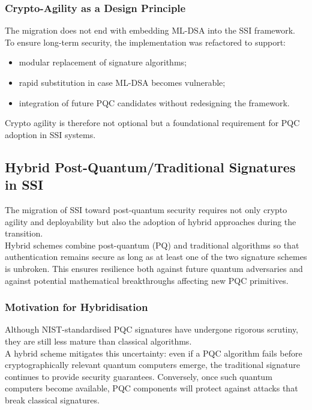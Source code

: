 \subsubsection*{Crypto-Agility as a Design Principle}
The migration does not end with embedding ML-DSA into the SSI framework.\\
To ensure long-term security, the implementation was refactored to support:
\begin{itemize}
    \item modular replacement of signature algorithms;
    \item rapid substitution in case ML-DSA becomes vulnerable;
    \item integration of future PQC candidates without redesigning the framework.
\end{itemize}

\noindent
Crypto agility is therefore not optional but a foundational requirement for PQC adoption in SSI systems.

\subsection *{Hybrid Post-Quantum/Traditional Signatures in SSI}

The migration of SSI toward post-quantum security requires not only crypto agility and deployability but also the adoption of hybrid approaches during the transition.\\
Hybrid schemes combine post-quantum (PQ) and traditional algorithms so that authentication remains secure as long as at least one of the two signature schemes is unbroken. This ensures resilience both against future quantum adversaries and against potential mathematical breakthroughs affecting new PQC primitives.

\subsubsection*{Motivation for Hybridisation}
Although NIST-standardised PQC signatures have undergone rigorous scrutiny, they are still less mature than classical algorithms.\\
A hybrid scheme mitigates this uncertainty: even if a PQC algorithm fails before cryptographically relevant quantum computers emerge, the traditional signature continues to provide security guarantees. Conversely, once such quantum computers become available, PQC components will protect against attacks that break classical signatures.
\medskip

